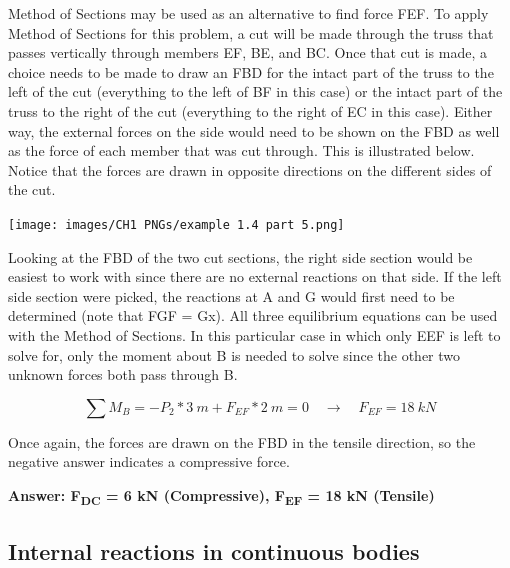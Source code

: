 \documentclass[
  letterpaper,
  DIV=11,
  numbers=noendperiod]{scrreprt}
\begin{document}
\begin{tcolorbox}
\begin{tcolorbox}
Method of Sections may be used as an alternative to find force FEF. To
apply Method of Sections for this problem, a cut will be made through
the truss that passes vertically through members EF, BE, and BC. Once
that cut is made, a choice needs to be made to draw an FBD for the
intact part of the truss to the left of the cut (everything to the left
of BF in this case) or the intact part of the truss to the right of the
cut (everything to the right of EC in this case). Either way, the
external forces on the side would need to be shown on the FBD as well as
the force of each member that was cut through. This is illustrated
below. Notice that the forces are drawn in opposite directions on the
different sides of the cut.

\begin{center}
\texttt{[image: images/CH1 PNGs/example 1.4 part 5.png]}
\end{center}

Looking at the FBD of the two cut sections, the right side section would
be easiest to work with since there are no external reactions on that
side. If the left side section were picked, the reactions at A and G
would first need to be determined (note that FGF = Gx). All three
equilibrium equations can be used with the Method of Sections. In this
particular case in which only EEF is left to solve for, only the moment
about B is needed to solve since the other two unknown forces both pass
through B.

\[
\sum M_B=-P_2*3{~m}+F_{E F}*2{~m}=0 \quad\rightarrow\quad F_{E F}=18{~kN}
\]

Once again, the forces are drawn on the FBD in the tensile direction, so
the negative answer indicates a compressive force.

\textbf{Answer: F\textsubscript{DC} = 6 kN (Compressive),
F\textsubscript{EF} = 18 kN (Tensile)}

\end{tcolorbox}

\end{tcolorbox}

\subsection{Internal reactions in continuous
bodies}\label{internal-reactions-in-continuous-bodies}
\end{document}
